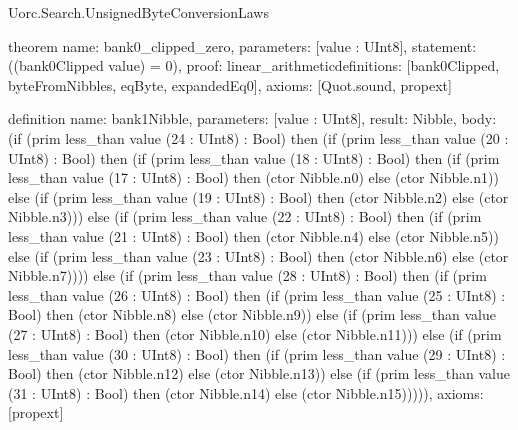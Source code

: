 \begin{lexlean}{Uorc.Search.UnsignedByteConversionLaws}
\begin{semanticmodule}
theorem{
  name: bank0_clipped_zero,
  parameters: [value : UInt8],
  statement: ((bank0Clipped value) = 0),
  proof: linear_arithmetic{definitions: [bank0Clipped, byteFromNibbles, eqByte, expandedEq0]},
  axioms: [Quot.sound, propext]
}

definition{
  name: bank1Nibble,
  parameters: [value : UInt8],
  result: Nibble,
  body: (if (prim less_than value (24 : UInt8) : Bool) then (if (prim less_than value (20 : UInt8) : Bool) then (if (prim less_than value (18 : UInt8) : Bool) then (if (prim less_than value (17 : UInt8) : Bool) then (ctor Nibble.n0) else (ctor Nibble.n1)) else (if (prim less_than value (19 : UInt8) : Bool) then (ctor Nibble.n2) else (ctor Nibble.n3))) else (if (prim less_than value (22 : UInt8) : Bool) then (if (prim less_than value (21 : UInt8) : Bool) then (ctor Nibble.n4) else (ctor Nibble.n5)) else (if (prim less_than value (23 : UInt8) : Bool) then (ctor Nibble.n6) else (ctor Nibble.n7)))) else (if (prim less_than value (28 : UInt8) : Bool) then (if (prim less_than value (26 : UInt8) : Bool) then (if (prim less_than value (25 : UInt8) : Bool) then (ctor Nibble.n8) else (ctor Nibble.n9)) else (if (prim less_than value (27 : UInt8) : Bool) then (ctor Nibble.n10) else (ctor Nibble.n11))) else (if (prim less_than value (30 : UInt8) : Bool) then (if (prim less_than value (29 : UInt8) : Bool) then (ctor Nibble.n12) else (ctor Nibble.n13)) else (if (prim less_than value (31 : UInt8) : Bool) then (ctor Nibble.n14) else (ctor Nibble.n15))))),
  axioms: [propext]
}


\end{semanticmodule}
\end{lexlean}
